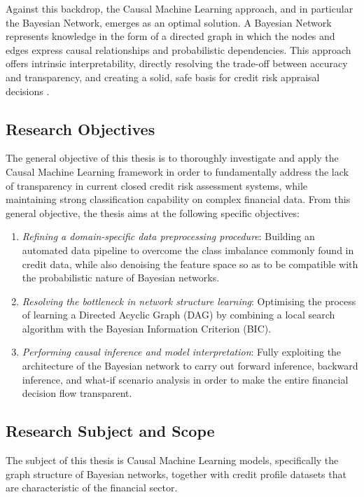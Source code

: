 Against this backdrop, the Causal Machine Learning approach, and in particular the Bayesian Network, emerges as an optimal solution. A Bayesian Network represents knowledge in the form of a directed graph in which the nodes and edges express causal relationships and probabilistic dependencies. This approach offers intrinsic interpretability, directly resolving the trade-off between accuracy and transparency, and creating a solid, safe basis for credit risk appraisal decisions \cite{liu2024credit}.

\subsection{Research Objectives}
\noindent
The general objective of this thesis is to thoroughly investigate and apply the Causal Machine Learning framework in order to fundamentally address the lack of transparency in current closed credit risk assessment systems, while maintaining strong classification capability on complex financial data. From this general objective, the thesis aims at the following specific objectives:
\begin{enumerate}
    \item \textit{Refining a domain-specific data preprocessing procedure}: Building an automated data pipeline to overcome the class imbalance commonly found in credit data, while also denoising the feature space so as to be compatible with the probabilistic nature of Bayesian networks.
    \item \textit{Resolving the bottleneck in network structure learning}: Optimising the process of learning a Directed Acyclic Graph (DAG) by combining a local search algorithm with the Bayesian Information Criterion (BIC).
    \item \textit{Performing causal inference and model interpretation}: Fully exploiting the architecture of the Bayesian network to carry out forward inference, backward inference, and what-if scenario analysis in order to make the entire financial decision flow transparent.
\end{enumerate}

\subsection{Research Subject and Scope}
\noindent
The subject of this thesis is Causal Machine Learning models, specifically the graph structure of Bayesian networks, together with credit profile datasets that are characteristic of the financial sector.

